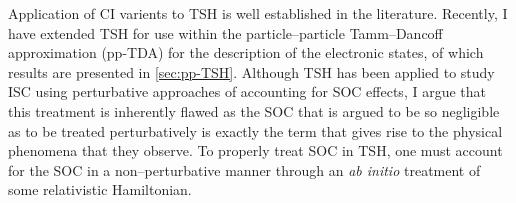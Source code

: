 Application of CI varients to TSH is well established in the literature.
Recently, I have extended TSH for use within the particle--particle
Tamm--Dancoff approximation (pp-TDA) for the description of the electronic
states\cite{DBWY16_Submitted1}, of which results are presented in
\cref{sec:pp-TSH}. Although TSH has been applied to study ISC using perturbative
approaches of accounting for SOC effects, I argue that this treatment is
inherently flawed as the SOC that is argued to be so negligible as to be treated
perturbatively is exactly the term that gives rise to the physical phenomena
that they observe. To properly treat SOC in TSH, one must account for the SOC in
a non--perturbative manner through an \emph{ab initio} treatment of some
relativistic Hamiltonian.

